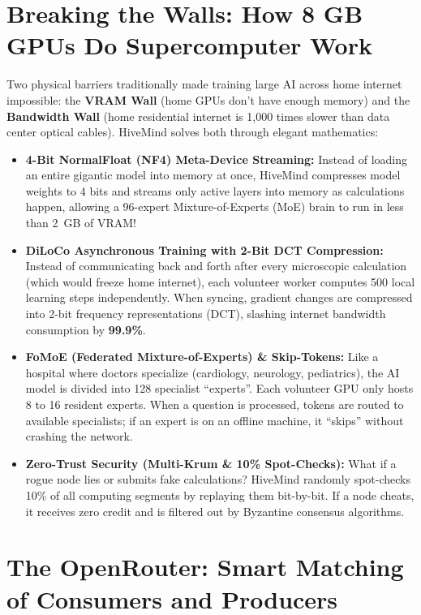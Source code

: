\documentclass[11pt,a4paper]{report}
\begin{document}
\section{Breaking the Walls: How 8 GB GPUs Do Supercomputer Work}

Two physical barriers traditionally made training large AI across home internet impossible: the \textbf{VRAM Wall} (home GPUs don't have enough memory) and the \textbf{Bandwidth Wall} (home residential internet is 1,000 times slower than data center optical cables). HiveMind solves both through elegant mathematics:

\begin{itemize}[leftmargin=1.8em]
    \item \textbf{4-Bit NormalFloat (NF4) Meta-Device Streaming:} Instead of loading an entire gigantic model into memory at once, HiveMind compresses model weights to 4 bits and streams only active layers into memory as calculations happen, allowing a 96-expert Mixture-of-Experts (MoE) brain to run in less than 2~GB of VRAM!
    \item \textbf{DiLoCo Asynchronous Training with 2-Bit DCT Compression:} Instead of communicating back and forth after every microscopic calculation (which would freeze home internet), each volunteer worker computes 500 local learning steps independently. When syncing, gradient changes are compressed into 2-bit frequency representations (DCT), slashing internet bandwidth consumption by \textbf{99.9\%}.
    \item \textbf{FoMoE (Federated Mixture-of-Experts) \& Skip-Tokens:} Like a hospital where doctors specialize (cardiology, neurology, pediatrics), the AI model is divided into 128 specialist ``experts''. Each volunteer GPU only hosts 8 to 16 resident experts. When a question is processed, tokens are routed to available specialists; if an expert is on an offline machine, it ``skips'' without crashing the network.
    \item \textbf{Zero-Trust Security (Multi-Krum \& 10\% Spot-Checks):} What if a rogue node lies or submits fake calculations? HiveMind randomly spot-checks 10\% of all computing segments by replaying them bit-by-bit. If a node cheats, it receives zero credit and is filtered out by Byzantine consensus algorithms.
\end{itemize}

\section{The OpenRouter: Smart Matching of Consumers and Producers}
\end{document}
